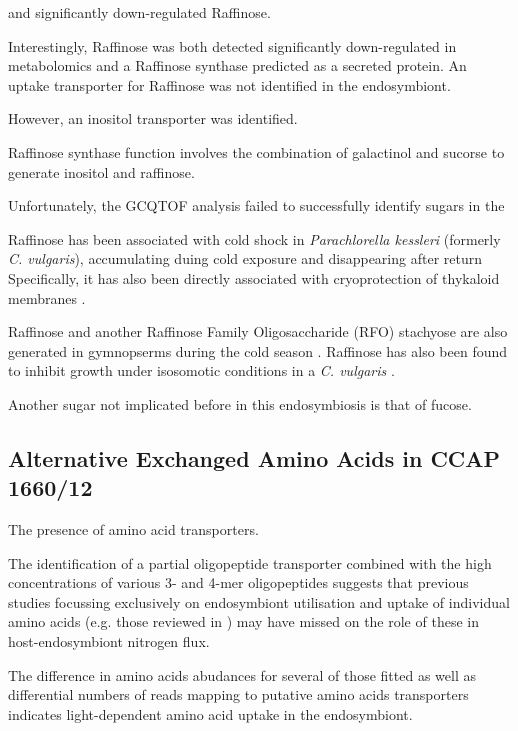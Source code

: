 and significantly down-regulated Raffinose. 



Interestingly, Raffinose was both detected
significantly down-regulated in metabolomics 
and a Raffinose synthase predicted as a secreted protein.
An uptake transporter for Raffinose was not identified in the endosymbiont.

However, an inositol transporter was identified. 


Raffinose synthase function involves the combination
of galactinol and sucorse to generate inositol and raffinose. 


Unfortunately, the GCQTOF analysis failed to successfully
identify sugars in the 


Raffinose has been associated with cold shock in
\textit{Parachlorella kessleri} (formerly \textit{C. vulgaris}),
accumulating duing cold exposure and disappearing after return
Specifically, it has also been directly associated
with cryoprotection of thykaloid membranes \citep{Lineberger1980}.

Raffinose and another Raffinose Family Oligosaccharide (RFO) 
stachyose are also generated in gymnopserms during
the cold season \citep{Kandler1982}.
Raffinose has also been found to inhibit growth under
isosomotic conditions in a \textit{C. vulgaris} 
\citep{Setter1979}.


Another sugar not implicated before in this endosymbiosis
is that of fucose. 


\subsection{Alternative Exchanged Amino Acids in CCAP 1660/12}





The presence of amino acid transporters.


The identification of a partial oligopeptide transporter 
combined with the high concentrations of various 3- and 4-mer oligopeptides
suggests that previous studies focussing exclusively on endosymbiont utilisation
and uptake of individual amino acids (e.g. those reviewed in \citep{Kato2009a}) 
may have missed on the role of these in host-endosymbiont nitrogen flux.




The difference in amino acids abudances for several of those fitted
as well as differential numbers of reads mapping to putative amino 
acids transporters indicates light-dependent amino acid uptake
in the endosymbiont. 



